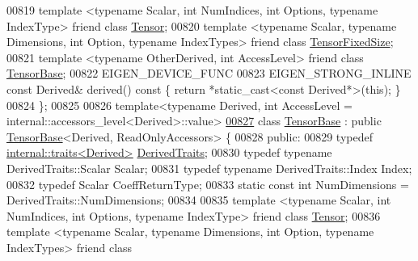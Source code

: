 \begin{DoxyCode}
00819     \textcolor{keyword}{template} <\textcolor{keyword}{typename} Scalar, \textcolor{keywordtype}{int} NumIndices, \textcolor{keywordtype}{int} Options, \textcolor{keyword}{typename} IndexType> \textcolor{keyword}{friend} \textcolor{keyword}{class }
      \hyperlink{class_eigen_1_1_tensor}{Tensor};
00820     \textcolor{keyword}{template} <\textcolor{keyword}{typename} Scalar, \textcolor{keyword}{typename} Dimensions, \textcolor{keywordtype}{int} Option, \textcolor{keyword}{typename} IndexTypes> \textcolor{keyword}{friend} \textcolor{keyword}{class }
      \hyperlink{class_eigen_1_1_tensor_fixed_size}{TensorFixedSize};
00821     \textcolor{keyword}{template} <\textcolor{keyword}{typename} OtherDerived, \textcolor{keywordtype}{int} AccessLevel> \textcolor{keyword}{friend} \textcolor{keyword}{class }\hyperlink{class_eigen_1_1_tensor_base}{TensorBase};
00822     EIGEN\_DEVICE\_FUNC
00823     EIGEN\_STRONG\_INLINE \textcolor{keyword}{const} Derived& derived()\textcolor{keyword}{ const }\{ \textcolor{keywordflow}{return} *\textcolor{keyword}{static\_cast<}\textcolor{keyword}{const }Derived*\textcolor{keyword}{>}(\textcolor{keyword}{this}); \}
00824 \};
00825 
00826 template<typename Derived, int AccessLevel = internal::accessors\_level<Derived>::value>
\hyperlink{class_eigen_1_1_tensor_base}{00827} \textcolor{keyword}{class }\hyperlink{class_eigen_1_1_tensor_base}{TensorBase} : \textcolor{keyword}{public} \hyperlink{class_eigen_1_1_tensor_base}{TensorBase}<Derived, ReadOnlyAccessors> \{
00828  \textcolor{keyword}{public}:
00829     \textcolor{keyword}{typedef} \hyperlink{struct_eigen_1_1internal_1_1traits}{internal::traits<Derived>} \hyperlink{struct_eigen_1_1internal_1_1traits}{DerivedTraits};
00830     \textcolor{keyword}{typedef} \textcolor{keyword}{typename} DerivedTraits::Scalar Scalar;
00831     \textcolor{keyword}{typedef} \textcolor{keyword}{typename} DerivedTraits::Index Index;
00832     \textcolor{keyword}{typedef} Scalar CoeffReturnType;
00833     \textcolor{keyword}{static} \textcolor{keyword}{const} \textcolor{keywordtype}{int} NumDimensions = DerivedTraits::NumDimensions;
00834 
00835     \textcolor{keyword}{template} <\textcolor{keyword}{typename} Scalar, \textcolor{keywordtype}{int} NumIndices, \textcolor{keywordtype}{int} Options, \textcolor{keyword}{typename} IndexType> \textcolor{keyword}{friend} \textcolor{keyword}{class }
      \hyperlink{class_eigen_1_1_tensor}{Tensor};
00836     \textcolor{keyword}{template} <\textcolor{keyword}{typename} Scalar, \textcolor{keyword}{typename} Dimensions, \textcolor{keywordtype}{int} Option, \textcolor{keyword}{typename} IndexTypes> \textcolor{keyword}{friend} \textcolor{keyword}{class }

\end{DoxyCode}
